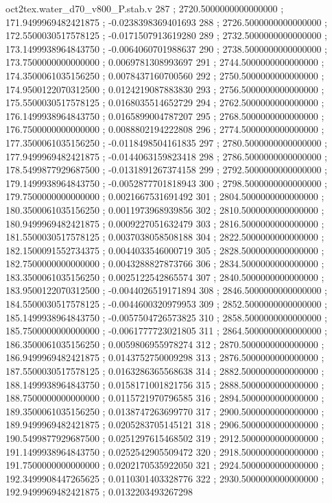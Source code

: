 \begin{filecontents}[overwrite]{oct2tex.water_d70_v800_P.stab.v}
287 ; 2720.5000000000000000 ; 171.9499969482421875 ; -0.0238398369401693
288 ; 2726.5000000000000000 ; 172.5500030517578125 ; -0.0171507913619280
289 ; 2732.5000000000000000 ; 173.1499938964843750 ; -0.0064060701988637
290 ; 2738.5000000000000000 ; 173.7500000000000000 ; 0.0069781308993697
291 ; 2744.5000000000000000 ; 174.3500061035156250 ; 0.0078437160700560
292 ; 2750.5000000000000000 ; 174.9500122070312500 ; 0.0124219087883830
293 ; 2756.5000000000000000 ; 175.5500030517578125 ; 0.0168035514652729
294 ; 2762.5000000000000000 ; 176.1499938964843750 ; 0.0165899004787207
295 ; 2768.5000000000000000 ; 176.7500000000000000 ; 0.0088802194222808
296 ; 2774.5000000000000000 ; 177.3500061035156250 ; -0.0118498504161835
297 ; 2780.5000000000000000 ; 177.9499969482421875 ; -0.0144063159823418
298 ; 2786.5000000000000000 ; 178.5499877929687500 ; -0.0131891267374158
299 ; 2792.5000000000000000 ; 179.1499938964843750 ; -0.0052877701818943
300 ; 2798.5000000000000000 ; 179.7500000000000000 ; 0.0021667531691492
301 ; 2804.5000000000000000 ; 180.3500061035156250 ; 0.0011973968939856
302 ; 2810.5000000000000000 ; 180.9499969482421875 ; 0.0009227051632479
303 ; 2816.5000000000000000 ; 181.5500030517578125 ; 0.0037038058508188
304 ; 2822.5000000000000000 ; 182.1500091552734375 ; 0.0044033546000719
305 ; 2828.5000000000000000 ; 182.7500000000000000 ; 0.0043288827873766
306 ; 2834.5000000000000000 ; 183.3500061035156250 ; 0.0025122542865574
307 ; 2840.5000000000000000 ; 183.9500122070312500 ; -0.0044026519171894
308 ; 2846.5000000000000000 ; 184.5500030517578125 ; -0.0044600320979953
309 ; 2852.5000000000000000 ; 185.1499938964843750 ; -0.0057504726573825
310 ; 2858.5000000000000000 ; 185.7500000000000000 ; -0.0061777723021805
311 ; 2864.5000000000000000 ; 186.3500061035156250 ; 0.0059806955978274
312 ; 2870.5000000000000000 ; 186.9499969482421875 ; 0.0143752750009298
313 ; 2876.5000000000000000 ; 187.5500030517578125 ; 0.0163286365568638
314 ; 2882.5000000000000000 ; 188.1499938964843750 ; 0.0158171001821756
315 ; 2888.5000000000000000 ; 188.7500000000000000 ; 0.0115721970796585
316 ; 2894.5000000000000000 ; 189.3500061035156250 ; 0.0138747263699770
317 ; 2900.5000000000000000 ; 189.9499969482421875 ; 0.0205283705145121
318 ; 2906.5000000000000000 ; 190.5499877929687500 ; 0.0251297615468502
319 ; 2912.5000000000000000 ; 191.1499938964843750 ; 0.0252542905509472
320 ; 2918.5000000000000000 ; 191.7500000000000000 ; 0.0202170535922050
321 ; 2924.5000000000000000 ; 192.3499908447265625 ; 0.0110301403328776
322 ; 2930.5000000000000000 ; 192.9499969482421875 ; 0.0132203493267298

\end{filecontents}
